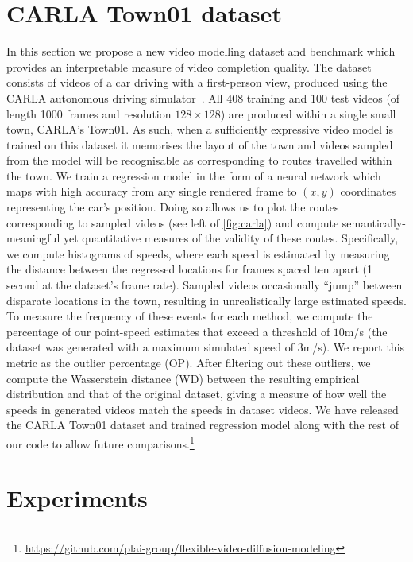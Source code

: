 \section{CARLA Town01 dataset}
\label{sec:fdm-carla}
In this section we propose a new video modelling dataset and benchmark which provides an interpretable measure of video completion quality. The dataset consists of videos of a car driving with a first-person view, produced using the CARLA autonomous driving simulator~\cite{dosovitskiy2017carla}. All 408 training and 100 test videos (of length 1000 frames and resolution $128\times128$) are produced within a single small town, CARLA's Town01. As such, when a sufficiently expressive video model is trained on this dataset it memorises the layout of the town and videos sampled from the model will be recognisable as corresponding to routes travelled within the town. We train a regression model in the form of a neural network which maps with high accuracy from any single rendered frame to $(x,y)$ coordinates representing the car's position. Doing so allows us to plot the routes corresponding to sampled videos (see left of \cref{fig:carla}) and compute semantically-meaningful yet quantitative measures of the validity of these routes. Specifically, we compute histograms of speeds, where each speed is estimated by measuring the distance between the regressed locations for frames spaced ten apart (1 second at the dataset's frame rate). Sampled videos occasionally ``jump'' between disparate locations in the town, resulting in unrealistically large estimated speeds. To measure the frequency of these events for each method, we compute the percentage of our point-speed estimates that exceed a threshold of $10$m/s (the dataset was generated with a maximum simulated speed of $3$m/s). We report this metric as the outlier percentage (OP). After filtering out these outliers, we compute the Wasserstein distance (WD) between the resulting empirical distribution and that of the original dataset, giving a measure of how well the speeds in generated videos match the speeds in dataset videos. We have released the CARLA Town01 dataset and trained regression model along with the rest of our code to allow future comparisons.\footnote{\url{https://github.com/plai-group/flexible-video-diffusion-modeling}}

\section{Experiments} \label{sec:fdm-experiments}

